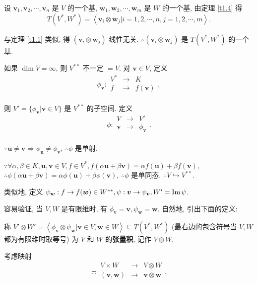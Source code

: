 \documentclass{ctexart}
\begin{document}
设 $\boldsymbol{v}_1,\boldsymbol{v}_2,\cdots,\boldsymbol{v}_n$ 是 $V$ 的一个基, $\boldsymbol{w}_1,\boldsymbol{w}_2,\cdots,\boldsymbol{w}_m$ 是 $W$ 的一个基, 由定理 \ref{t1.4} 得
\[T(V^*,W^*)=\left<\boldsymbol{v}_i\otimes\boldsymbol{w}_j|i=1,2,\cdots,n,j=1,2,\cdots,m\right>.\]

与定理 \ref{t1.1} 类似, 得 $(\boldsymbol{v}_i\otimes\boldsymbol{w}_j)$ 线性无关. $\therefore(\boldsymbol{v}_i\otimes\boldsymbol{w}_j)$ 是 $T(V^*,W^*)$ 的一个基.

如果 $\dim V=\infty$, 则 $V^{**}$ 不一定 $=V$. 对 $\boldsymbol{v}\in V$, 定义
\[\phi_{\boldsymbol{v}}:\begin{array}{rcl}
    V^* & \to & K \\
    f & \to & f(\boldsymbol{v}) \\
\end{array},\]

则 $V'=\{\phi_{\boldsymbol{v}}|\boldsymbol{v}\in V\}$ 是 $V^{**}$ 的子空间. 定义
\[\phi:\begin{array}{rcl}
    V & \to & V' \\
    \boldsymbol{v} & \to & \phi_{\boldsymbol{v}} \\
\end{array}.\]

$\because\boldsymbol{u}\neq\boldsymbol{v}\Rightarrow\phi_{\boldsymbol{u}}\neq\phi_{\boldsymbol{v}}$, $\therefore\phi$ 是单射.

$\because\forall\alpha,\beta\in K,\boldsymbol{u},\boldsymbol{v}\in V,f\in V^*,f(\alpha\boldsymbol{u}+\beta\boldsymbol{v})=\alpha f(\boldsymbol{u})+\beta f(\boldsymbol{v})$, $\therefore\phi(\alpha\boldsymbol{u}+\beta\boldsymbol{v})=\alpha\phi(\boldsymbol{u})+\beta\phi(\boldsymbol{v})$, $\therefore\phi$ 是单同态. $\therefore V\hookrightarrow V^{**}$.

类似地, 定义 $\psi_{\boldsymbol{w}}:f\to f(\boldsymbol{w})\in W^{**},\psi:\boldsymbol{v}\to\psi_{\boldsymbol{v}},W'=\operatorname{Im} \psi$.

容易验证, 当 $V,W$ 是有限维时, 有 $\phi_{\boldsymbol{v}}=\boldsymbol{v},\psi_{\boldsymbol{w}}=\boldsymbol{w}$. 自然地, 引出下面的定义:
\begin{definition}\label{d1.2}
    称 $V'\otimes W'=\left<\phi_{\boldsymbol{v}}\otimes\psi_{\boldsymbol{w}}|\boldsymbol{v}\in V,\boldsymbol{w}\in W\right>\subseteq T(V^*,W^*)$ (最右边的包含符号当 $V,W$ 都为有限维时取等号) 为 $V$ 和 $W$ 的\textbf{张量积}, 记作 $V\otimes W$.
\end{definition}
考虑映射
\[\tau:\begin{array}{rcl}
    V\times W & \to & V\otimes W \\
    (\boldsymbol{v},\boldsymbol{w}) & \to & \boldsymbol{v}\otimes\boldsymbol{w} \\
\end{array}.\]
\end{document}
